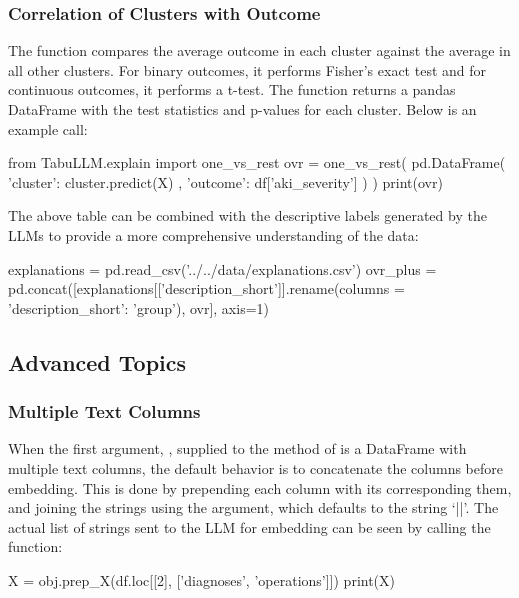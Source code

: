 \documentclass[article]{jss}
\begin{document}
\subsubsection{Correlation of Clusters with Outcome}\label{subsubsec:using-explain-one-vs-rest}

The  function compares the average outcome in each cluster against the average in all other clusters. For binary outcomes, it performs Fisher's exact test and for continuous outcomes, it performs a t-test. The function returns a pandas DataFrame with the test statistics and p-values for each cluster. Below is an example call:
\begin{pyblock}
from TabuLLM.explain import one_vs_rest
ovr = one_vs_rest(
    pd.DataFrame({
        'cluster': cluster.predict(X)
        , 'outcome': df['aki_severity']
    })
)
print(ovr)
\end{pyblock}
\stdoutpythontex %

The above table can be combined with the descriptive labels generated by the LLMs to provide a more comprehensive understanding of the data:
\begin{pyblock}
explanations = pd.read_csv('../../data/explanations.csv')
ovr_plus = pd.concat([explanations[['description_short']].rename(columns = {'description_short': 'group'}), ovr], axis=1)
\end{pyblock}

\subsection[Advanced Topics]{Advanced Topics}\label{subsec:using-advanced}

\subsubsection[Multiple Text Columns]{Multiple Text Columns}\label{subsubsec:using-multiple-columns}

When the first argument, , supplied to the  method of  is a DataFrame with multiple text columns, the default behavior is to concatenate the columns before embedding. This is done by prepending each column with its corresponding them, and joining the strings using the  argument, which defaults to the string `||'. The actual list of strings sent to the LLM for embedding can be seen by calling the  function:
\begin{pyblock}
X = obj.prep_X(df.loc[[2], ['diagnoses', 'operations']])
print(X)
\end{pyblock}
\stdoutpythontex %
\end{document}
